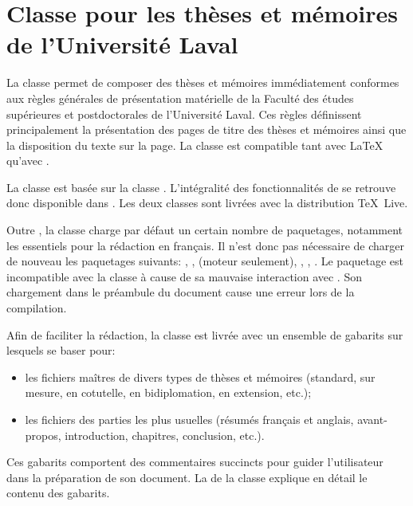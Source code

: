 \chapter{Classe pour les thèses et mémoires de
  l'Université Laval}
\label{chap:ulthese}

La classe  \citep{ulthese} permet de composer des
thèses et mémoires immédiatement conformes aux règles générales de
présentation matérielle de la Faculté des études supérieures et
postdoctorales de l'Université Laval. Ces règles définissent
principalement la présentation des pages de titre des thèses et
mémoires ainsi que la disposition du texte sur la page. La classe est
compatible tant avec {\LaTeX} qu'avec {\XeLaTeX}.

La classe  est basée sur la classe .
L'intégralité des fonctionnalités de  se retrouve donc
disponible dans . Les deux classes sont livrées avec la
distribution {\TeX}~Live.

Outre , la classe charge par défaut un certain nombre de
paquetages, notamment les essentiels pour la rédaction en français. Il
n'est donc pas nécessaire de charger de nouveau les paquetages
suivants: , ,  
(moteur {\XeLaTeX} seulement), , ,
. Le paquetage  est incompatible avec la
classe à cause de sa mauvaise interaction avec . Son
chargement dans le préambule du document cause une erreur lors de la
compilation.

Afin de faciliter la rédaction, la classe est livrée avec un ensemble
de gabarits sur lesquels se baser pour:
\begin{itemize}
\item les fichiers maîtres de divers types de thèses et mémoires
  (standard, sur mesure, en cotutelle, en bidiplomation, en
  extension, etc.);
\item les fichiers des parties les plus usuelles (résumés français
  et anglais, avant-propos, introduction, chapitres, conclusion,
  etc.).
\end{itemize}
Ces gabarits comportent des commentaires succincts pour guider
l'utilisateur dans la préparation de son document. La
de la classe explique en détail le contenu des gabarits.



